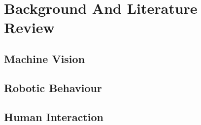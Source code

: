 \chapter{Background And Literature Review}
\label{chapter2}

\section{Machine Vision}

\section{Robotic Behaviour}

\section{Human Interaction}